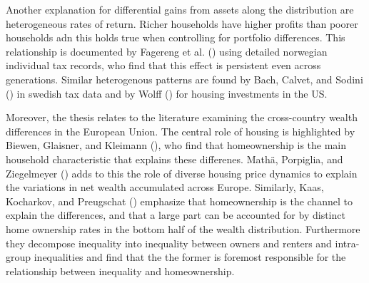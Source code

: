 \documentclass[
  a4paper,
  DIV=11,
  numbers=noendperiod]{scrartcl}
\begin{document}
Another explanation for differential gains from assets along the
distribution are heterogeneous rates of return. Richer households have
higher profits than poorer households adn this holds true when
controlling for portfolio differences. This relationship is documented
by Fagereng et al.
() using
detailed norwegian individual tax records, who find that this effect is
persistent even across generations. Similar heterogenous patterns are
found by Bach, Calvet, and Sodini
() in swedish tax data and
by Wolff () for
housing investments in the US.

Moreover, the thesis relates to the literature examining the
cross-country wealth differences in the European Union. The central role
of housing is highlighted by Biewen, Glaisner, and Kleimann
(), who find that
homeownership is the main household characteristic that explains these
differenes. Mathä, Porpiglia, and Ziegelmeyer
() adds to this the
role of diverse housing price dynamics to explain the variations in net
wealth accumulated across Europe. Similarly, Kaas, Kocharkov, and
Preugschat ()
emphasize that homeownership is the channel to explain the differences,
and that a large part can be accounted for by distinct home ownership
rates in the bottom half of the wealth distribution. Furthermore they
decompose inequality into inequality between owners and renters and
intra-group inequalities and find that the the former is foremost
responsible for the relationship between inequality and homeownership.
\end{document}
